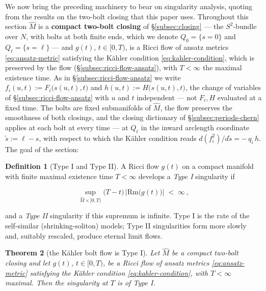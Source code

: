 \documentclass[11pt]{amsart}
\theoremstyle{plain}
\numberwithin{equation}{section}
\newtheorem{theorem}{Theorem}[section]
\theoremstyle{definition}
\newtheorem{definition}[theorem]{Definition}
\theoremstyle{remark}
\begin{document}
We now bring the preceding machinery to bear on singularity analysis, quoting from \cite{FT} the results on the two-bolt closing that this paper uses. Throughout this section $\widehat{M}$ is a \textbf{compact two-bolt closing} of \S\ref{subsec:closing} --- the $S^2$-bundle over $N$, with bolts at both finite ends, which we denote $Q_0 = \{ s = 0 \}$ and $Q_\ell = \{ s = \ell \}$ --- and $g(t)$, $t \in [0, T)$, is a Ricci flow of ansatz metrics \eqref{eq:ansatz-metric} satisfying the Kähler condition \eqref{eq:kahler-condition}, which is preserved by the flow (\S\ref{subsec:ricci-flow-ansatz}), with $T < \infty$ the maximal existence time. As in \S\ref{subsec:ricci-flow-ansatz} we write $f_i(u,t) := F_i\big(s(u,t), t\big)$ and $h(u,t) := H\big(s(u,t), t\big)$, the change of variables of \S\ref{subsec:ricci-flow-ansatz} with $u$ and $t$ independent --- not $F_i, H$ evaluated at a fixed time. The bolts are fixed submanifolds of $\widehat{M}$, the flow preserves the smoothness of both closings, and the closing dictionary of \S\ref{subsec:periods-chern} applies at each bolt at every time --- at $Q_\ell$ in the inward arclength coordinate $\tilde{s} := \ell - s$, with respect to which the Kähler condition reads $d ( f_i^2 ) / d\tilde{s} = -\, q_i\, h$. The goal of the section:

\begin{definition}[Type I and Type II]\label{def:type-I-II}
	A Ricci flow $g(t)$ on a compact manifold with finite maximal existence time $T < \infty$ develops a \emph{Type I} singularity if
	
	\[
	\sup_{\widehat{M} \times [0, T)} \big( T - t \big)\, \big| \mathrm{Rm}\big( g(t) \big) \big| \;<\; \infty \,,
	\]
	
	and a \emph{Type II} singularity if this supremum is infinite. Type I is the rate of the self-similar (shrinking-soliton) models; Type II singularities form more slowly and, suitably rescaled, produce eternal limit flows.
	
\end{definition}

\begin{theorem}[the Kähler bolt flow is Type I]\label{thm:two-bolt-typeI}
	Let $\widehat{M}$ be a compact two-bolt closing and let $g(t)$, $t \in [0, T)$, be a Ricci flow of ansatz metrics \eqref{eq:ansatz-metric} satisfying the Kähler condition \eqref{eq:kahler-condition}, with $T < \infty$ maximal. Then the singularity at $T$ is of Type I.
	
\end{theorem}
\end{document}
